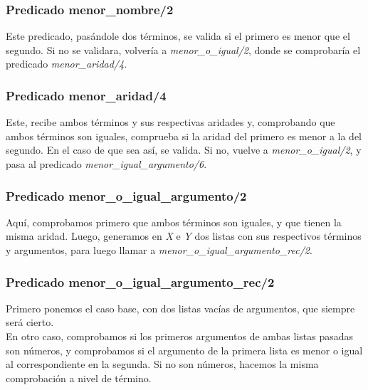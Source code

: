 \documentclass[12pt, a4paper, spanish]{article}
\begin{document}
\subsubsection{Predicado menor\_nombre/2}


Este predicado, pasándole dos términos, se valida si el primero es menor que el segundo. Si no se validara, volvería a \textit{menor\_o\_igual/2}, donde se comprobaría el predicado \textit{menor\_aridad/4}.

\subsubsection{Predicado menor\_aridad/4}


Este, recibe ambos términos y sus respectivas aridades y, comprobando que ambos términos son iguales, comprueba si la aridad del primero es menor a la del segundo. En el caso de que sea así, se valida. Si no, vuelve a \textit{menor\_o\_igual/2}, y pasa al predicado \textit{menor\_igual\_argumento/6}.

\subsubsection{Predicado menor\_o\_igual\_argumento/2}


Aquí, comprobamos primero que ambos términos son iguales, y que tienen la misma aridad. Luego, generamos en \textit{X} e \textit{Y} dos listas con sus respectivos términos y argumentos, para luego llamar a \textit{menor\_o\_igual\_argumento\_rec/2}.

\subsubsection{Predicado menor\_o\_igual\_argumento\_rec/2}


Primero ponemos el caso base, con dos listas vacías de argumentos, que siempre será cierto.\\

En otro caso, comprobamos si los primeros argumentos de ambas listas pasadas son números, y comprobamos si el argumento de la primera lista es menor o igual al correspondiente en la segunda. Si no son números, hacemos la misma comprobación a nivel de término.\\
\end{document}
